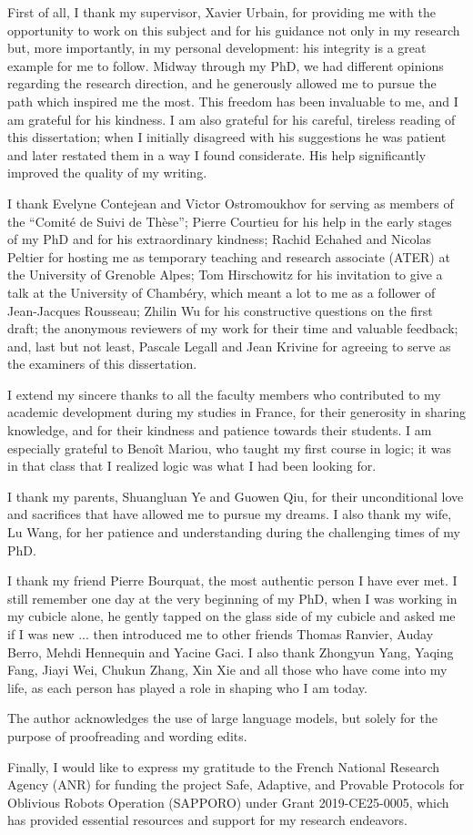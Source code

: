 First of all, I thank my supervisor, Xavier Urbain, for providing me with the opportunity to work on this subject and for his guidance not only in my research but, more importantly, in my personal development: his integrity is a great example for me to follow. Midway through my PhD, we had different opinions regarding the research direction, and he generously allowed me to pursue the path which inspired me the most. This freedom has been invaluable to me, and I am grateful for his kindness. I am also grateful for his careful, tireless reading of this dissertation; when I initially disagreed with his suggestions he was patient and later restated them in a way I found considerate. His help significantly improved the quality of my writing.

I thank Evelyne Contejean and Victor Ostromoukhov for serving as members of the \enquote{Comité de Suivi de Thèse}; Pierre Courtieu for his help in the early stages of my PhD and for his extraordinary kindness; Rachid Echahed and Nicolas Peltier for hosting me as temporary teaching and research associate (ATER) at the University of Grenoble Alpes;
Tom Hirschowitz for his invitation to give a talk at the University of Chambéry, which meant a lot to me as a follower of Jean-Jacques Rousseau; 
Zhilin Wu for his constructive questions on the first draft;
the anonymous reviewers of my work for their time and valuable feedback; and, last but not least, Pascale Legall and Jean Krivine for agreeing to serve as the examiners of this dissertation.

I extend my sincere thanks to all the faculty members who contributed to my academic development during my studies in France, for their generosity in sharing knowledge, and for their kindness and patience towards their students. I am especially grateful to Benoît Mariou, who taught my first course in logic; it was in that class that I realized logic was what I had been looking for.

I thank my parents, Shuangluan Ye and Guowen Qiu, for their unconditional love and sacrifices that have allowed me to pursue my dreams. I also thank my wife, Lu Wang, for her patience and understanding during the challenging times of my PhD.

I thank my friend Pierre Bourquat, the most authentic person I have ever met. I still remember one day at the very beginning of my PhD, when I was working in my cubicle alone, he gently tapped on the glass side of my cubicle and asked me if I was new ... then introduced me to other friends Thomas Ranvier, Auday Berro, Mehdi Hennequin and Yacine Gaci. I also thank Zhongyun Yang, Yaqing Fang, Jiayi Wei, Chukun Zhang, Xin Xie and all those who have come into my life, as each person has played a role in shaping who I am today.

The author acknowledges the use of large language models, but solely for the purpose of proofreading and wording edits.

Finally, I would like to express my gratitude to the French National Research Agency (ANR) for funding the project Safe, Adaptive, and Provable Protocols for Oblivious Robots Operation (SAPPORO) under Grant 2019-CE25-0005, which has provided essential resources and support for my research endeavors.  
